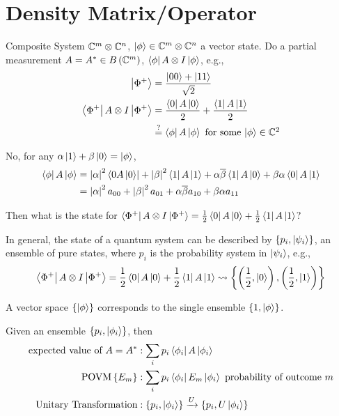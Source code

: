 \section{Density Matrix/Operator}

Composite System $\mathbb{C}^m \otimes \mathbb{C}^n$, $\left|\phi\right\rangle \in \mathbb{C}^m \otimes \mathbb{C}^n$
a vector state. Do a partial measurement $A = A^*\in B\left(\mathbb{C}^m\right)$,
$\left\langle \phi\right|A\otimes I\left|\phi\right\rangle$, e.g.,
\begin{align*}
    \left|\Phi^+\right\rangle                           & = \frac{\left|00\right\rangle + \left|11\right\rangle}{\sqrt{2}}                                               \\
    \left\langle \Phi^+\right|A\otimes I\left|\Phi^+\right\rangle & = \frac{\left\langle 0\right|A\left|0\right\rangle}{2} + \frac{\left\langle 1\right|A\left|1\right\rangle}{2}                              \\
                                           & \overset{?}{=} \left\langle \phi\right|A\left|\phi\right\rangle\hbox{ for some $\left|\phi\right\rangle \in \mathbb{C}^2$}
\end{align*}

No, for any $\alpha\left|1\right\rangle + \beta\left|0\right\rangle = \left|\phi\right\rangle$,
\begin{align*}\left\langle \phi\right|A\left|\phi\right\rangle
     & = \left\lvert\alpha\right\rvert^2\left\langle 0A\left|0\right\rangle\right| + \left\lvert\beta\right\rvert^2\left\langle 1\right|A\left|1\right\rangle + \alpha\overline{\beta}\left\langle 1\right|A\left|0\right\rangle + \beta\alpha\left\langle 0\right|A\left|1\right\rangle \\
     & = \left\lvert\alpha\right\rvert^2a_{00} + \left\lvert\beta\right\rvert^2a_{01} + \alpha\overline{\beta}a_{10} + \beta\alpha a_{11}
\end{align*}

Then what is the state for $\left\langle \Phi^+\right|A\otimes I\left|\Phi^+\right\rangle = \frac{1}{2}\left\langle 0\right|A\left|0\right\rangle + \frac{1}{2}\left\langle 1\right|A\left|1\right\rangle$?

In general, the state of a quantum system can be described by $\left\lbrace p_i, \left|\psi_i\right\rangle\right\rbrace$,
an ensemble of pure states, where $p_i$ is the probability system in $\left|\psi_i\right\rangle$,
e.g.,
\[\left\langle \Phi^+\right|A\otimes I\left|\Phi^+\right\rangle = \frac{1}{2}\left\langle 0\right|A\left|0\right\rangle + \frac{1}{2}\left\langle 1\right|A\left|1\right\rangle \rightsquigarrow \left\lbrace\left(\frac{1}{2},\left|0\right\rangle\right), \left(\frac{1}{2},\left|1\right\rangle\right)\right\rbrace\]

A vector space $\left\lbrace\left|\phi\right\rangle\right\rbrace$ corresponds to the single ensemble $\left\lbrace1, \left|\phi\right\rangle\right\rbrace$.

Given an ensemble $\left\lbrace p_i, \left|\phi_i\right\rangle\right\rbrace$, then
\begin{align*}
    \hbox{expected value of }A = A^* & : \sum_i p_i\left\langle \phi_i\right|A\left|\phi_i\right\rangle                                     \\
    \hbox{POVM} \left\lbrace E_m\right\rbrace            & : \sum_i p_i\left\langle \phi_i\right|E_m\left|\phi_i\right\rangle\hbox{ probability of outcome $m$} \\
    \hbox{Unitary Transformation}    & : \left\lbrace p_i, \left|\phi_i\right\rangle\right\rbrace \xrightarrow{U} \left\lbrace p_i, U\left|\phi_i\right\rangle\right\rbrace
\end{align*}

